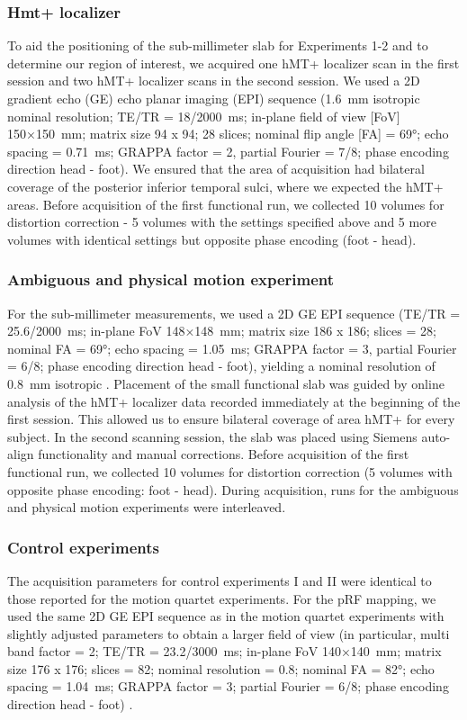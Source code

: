 \subsubsection{Hmt+ localizer}
To aid the positioning of the sub-millimeter slab for Experiments 1-2 and to determine our region of interest, we acquired one hMT+ localizer scan in the first session and two hMT+ localizer scans in the second session. We used a 2D gradient echo (GE) echo planar imaging (EPI) sequence (1.6~mm isotropic nominal resolution; TE/TR = 18/2000~ms; in-plane field of view [FoV] 150×150~mm; matrix size 94 x 94; 28 slices; nominal flip angle [FA] = 69°; echo spacing = 0.71~ms; GRAPPA factor = 2, partial Fourier = 7/8; phase encoding direction head - foot). We ensured that the area of acquisition had bilateral coverage of the posterior inferior temporal sulci, where we expected the hMT+ areas. Before acquisition of the first functional run, we collected 10 volumes for distortion correction - 5 volumes with the settings specified above and 5 more volumes with identical settings but opposite phase encoding (foot - head).

\subsubsection{Ambiguous and physical motion experiment}
For the sub-millimeter measurements, we used a 2D GE EPI sequence (TE/TR = 25.6/2000~ms; in-plane FoV 148×148~mm; matrix size 186 x 186; slices = 28; nominal FA = 69°; echo spacing = 1.05~ms; GRAPPA factor = 3, partial Fourier = 6/8; phase encoding direction head - foot), yielding a nominal resolution of 0.8~mm isotropic \parencite{Moeller2010, Setsompop2012}. Placement of the small functional slab was guided by online analysis of the hMT+ localizer data recorded immediately at the beginning of the first session. This allowed us to ensure bilateral coverage of area hMT+ for every subject. In the second scanning session, the slab was placed using Siemens auto-align functionality and manual corrections. Before acquisition of the first functional run, we collected 10 volumes for distortion correction (5 volumes with opposite phase encoding: foot - head). During acquisition, runs for the ambiguous and physical motion experiments were interleaved.

\subsubsection{Control experiments}
The acquisition parameters for control experiments I and II were identical to those reported for the motion quartet experiments. For the pRF mapping, we used the same 2D GE EPI sequence as in the motion quartet experiments with slightly adjusted parameters to obtain a larger field of view (in particular, multi band factor = 2; TE/TR = 23.2/3000~ms; in-plane FoV 140×140~mm; matrix size 176 x 176; slices = 82; nominal resolution = 0.8; nominal FA = 82°; echo spacing = 1.04~ms; GRAPPA factor = 3; partial Fourier = 6/8; phase encoding direction head - foot) \parencite{Moeller2010, Setsompop2012, Feinberg2010}.

